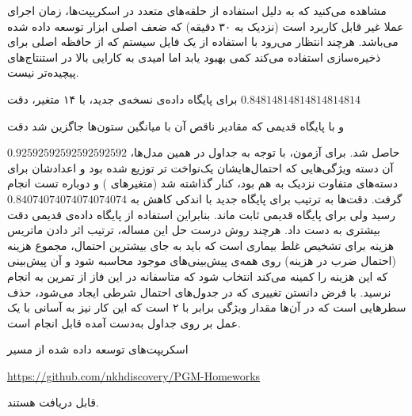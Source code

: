\documentclass[11.5pt,a4paper]{article}
\begin{document}
مشاهده می‌کنید که به دلیل استفاده از حلقه‌های متعدد در اسکریپت‌ها، زمان اجرای  عملا غیر قابل کاربرد است (نزدیک به ۳۰ دقیقه) که ضعف اصلی ابزار توسعه داده شده می‌باشد. هرچند انتظار می‌رود با استفاده از یک فایل سیستم  که از حافظه اصلی  برای ذخیره‌سازی استفاده می‌کند کمی بهبود یابد اما امیدی به کارایی بالا در استنتاج‌های پیچیده‌تر نیست. 

برای پایگاه داده‌ی نسخه‌ی جدید، با ۱۴ متغیر، دقت
$0.84814814814814814814$

و با پایگاه قدیمی که مقادیر ناقص آن با میانگین ستون‌ها جاگزین شد دقت  

$0.92592592592592592592$ حاصل شد. برای آزمون، با توجه به جداول  در همین مدل‌ها، آن دسته ویژگی‌هایی که احتمال‌هایشان یک‌نواخت تر توزیع شده بود و اعدادشان برای دسته‌های متفاوت نزدیک به هم بود، کنار گذاشته شد (متغیرهای 
)
و دوباره تست انجام گرفت. دقت‌ها به ترتیب برای پایگاه جدید با اندکی کاهش به 
$0.84074074074074074074$
رسید ولی برای پایگاه قدیمی ثابت ماند. بنابراین استفاده از پایگاه داده‌ی قدیمی دقت بیشتری به دست داد. هرچند روش درست حل این مساله، ترتیب اثر دادن ماتریس هزینه برای تشخیص غلط بیماری است که باید به جای بیشترین احتمال، مجموع هزینه (احتمال ضرب در هزینه) روی همه‌ی پیش‌بینی‌های موجود محاسبه شود و آن پیش‌بینی که این هزینه را کمینه می‌کند انتخاب شود که متاسفانه در این فاز از تمرین به انجام نرسید. با فرض دانستن  تغییری که در جدول‌های احتمال شرطی ایجاد می‌شود، حذف سطرهایی است که در آن‌ها مقدار ویژگی برابر با ۲ است که این کار نیز به آسانی با یک عمل  بر روی جداول به‌دست آمده قابل انجام است. 
 
اسکریپت‌های توسعه‌ داده شده از مسیر 

\url{https://github.com/nkhdiscovery/PGM-Homeworks}

قابل دریافت هستند. 
\end{document}
